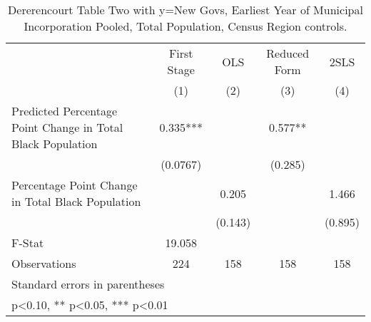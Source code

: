\begin{table}[htbp]\centering
\def\sym#1{\ifmmode^{#1}\else\(^{#1}\)\fi}
\caption{Dererencourt Table Two with y=New Govs, Earliest Year of Municipal Incorporation  Pooled, Total Population, Census Region controls.}
\begin{tabular}{l*{4}{c}}
\toprule
                    & First Stage   &         OLS   &Reduced Form   &        2SLS   \\
                    &\multicolumn{1}{c}{(1)}   &\multicolumn{1}{c}{(2)}   &\multicolumn{1}{c}{(3)}   &\multicolumn{1}{c}{(4)}   \\
\midrule
Predicted Percentage Point Change in Total Black Population&       0.335***&               &       0.577** &               \\
                    &    (0.0767)   &               &     (0.285)   &               \\
\addlinespace
Percentage Point Change in Total Black Population&               &       0.205   &               &       1.466   \\
                    &               &     (0.143)   &               &     (0.895)   \\
\midrule
F-Stat              &      19.058   &               &               &               \\
Observations        &         224   &         158   &         158   &         158   \\
\bottomrule
\multicolumn{5}{l}{\footnotesize Standard errors in parentheses}\\
\multicolumn{5}{l}{\footnotesize * p<0.10, ** p<0.05, *** p<0.01}\\
\end{tabular}
\end{table}
